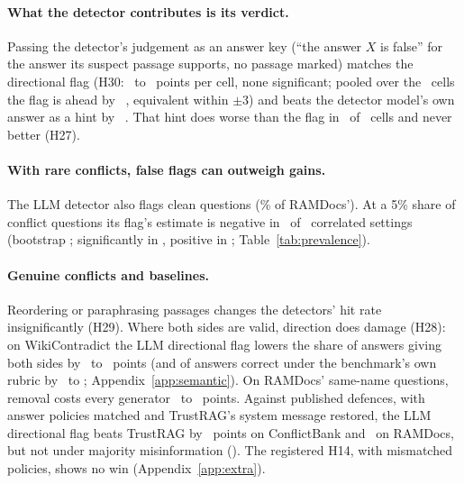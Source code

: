 \paragraph{What the detector contributes is its verdict.} Passing the detector's judgement as an answer key (``the
answer $X$ is false'' for the answer its suspect passage supports, no passage marked) matches the directional flag
(H30: \hThirtyAMin\ to \hThirtyAMax\ points per cell, none significant; pooled over the \PoolThirtyAK\ cells the flag
is ahead by \PoolThirtyA\ \PoolThirtyACI, equivalent within $\pm$3) and beats the detector model's own answer as a
hint by \PoolThirtyB\ \PoolThirtyBCI. That hint does worse than the flag in \nHTwentySevenAPos\ of
\nHTwentySevenATests\ cells and never better (H27).

\paragraph{With rare conflicts, false flags can outweigh gains.} The LLM detector also flags clean questions
(\cleanFprLlm\% of RAMDocs'). At a 5\% share of conflict questions its flag's estimate is negative in \prevNegFive\ of \prevN\ correlated settings
(bootstrap \prevNegFiveCI; significantly in \prevSigNeg, positive in \prevSigPos; Table~\ref{tab:prevalence}).

\paragraph{Genuine conflicts and baselines.} Reordering \citep{liu2024lost} or paraphrasing passages changes the
detectors' hit rate insignificantly (H29). Where both sides are valid, direction does damage (H28): on WikiContradict the LLM directional
flag lowers the share of answers giving both sides by \ahTwentyEightWcMiniDir\ to \ahTwentyEightWcLunaDir\ points
(and of answers correct under the benchmark's own rubric by \awikiOrigMiniEffPt\ to \awikiOrigLunaEffPt;
Appendix~\ref{app:semantic}). On RAMDocs' same-name questions, removal costs every generator
\ahTwentyEightAmbMiniRem\ to \ahTwentyEightAmbLunaRem\ points. Against published defences, with answer policies matched and TrustRAG's
system message restored, the LLM directional flag beats TrustRAG by \blHFourteenCbs\ points on ConflictBank and
\blHFourteenRd\ on RAMDocs, but not under majority misinformation (\blHFourteenMj). The registered H14, with
mismatched policies, shows no win (Appendix~\ref{app:extra}).
